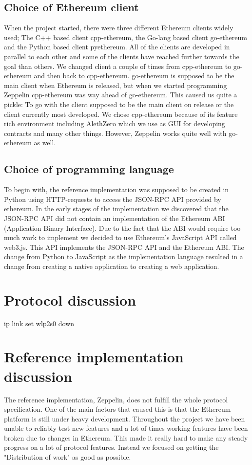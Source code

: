 \subsection{Choice of Ethereum client}
When the project started, there were three different Ethereum clients widely used; The C++ based client cpp-ethereum, the Go-lang based client go-ethereum and the Python based client pyethereum. All of the clients are developed in parallel to each other and some of the clients have reached further towards the goal than others. We changed client a couple of times from cpp-ethereum to go-ethereum and then back to cpp-ethereum. go-ethereum is supposed to be the main client when Ethereum is released, but when we started programming Zeppelin cpp-ethereum was way ahead of go-ethereum. This caused us quite a pickle: To go with the client supposed to be the main client on release or the client currently most developed. We chose cpp-ethereum because of its feature rich environment including AlethZero which we use as GUI for developing contracts and many other things. However, Zeppelin works quite well with go-ethereum as well. 

\subsection{Choice of programming language}
To begin with, the reference implementation was supposed to be created in Python using HTTP-requests to access the JSON-RPC API provided by ethereum. In the early stages of the implementation we discovered that the JSON-RPC API did not contain an implementation of the Ethereum ABI (Application Binary Interface). Due to the fact that the ABI would require too much work to implement we decided to use Ethereum's JavaScript API called web3.js. This API implements the JSON-RPC API and the Ethereum ABI. The change from Python to JavaScript as the implementation language resulted in a change from creating a native application to creating a web application.

\section{Protocol discussion}
ip link set wlp2s0 down

\section{Reference implementation discussion}
The reference implementation, Zeppelin, does not fulfill the whole protocol specification. One of the main factors that caused this is that the Ethereum platform is still under heavy development. Throughout the project we have been unable to reliably test new features and a lot of times working features have been broken due to changes in Ethereum. This made it really hard to make any steady progress on a lot of protocol features. Instead we focused on getting the "Distribution of work" as good as possible. 

